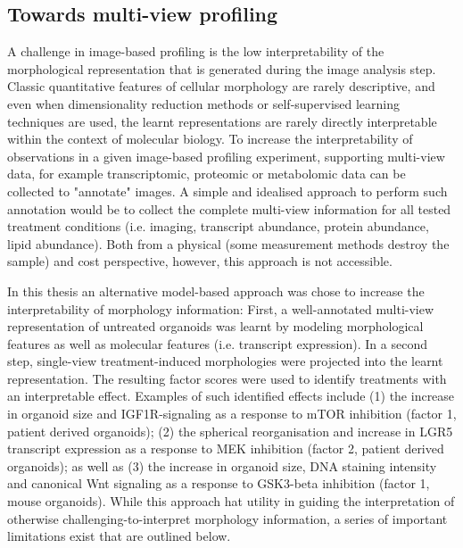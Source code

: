 \begin{flushleft}
\subsection{Towards multi-view profiling}
A challenge in image-based profiling is the low interpretability of the morphological representation that is generated during the image analysis step. Classic quantitative features of cellular morphology are rarely descriptive, and even when dimensionality reduction methods or self-supervised learning techniques are used, the learnt representations are rarely directly interpretable within the context of molecular biology. To increase the interpretability of observations in a given image-based profiling experiment, supporting multi-view data, for example transcriptomic, proteomic or metabolomic data can be collected to "annotate" images. A simple and idealised approach to perform such annotation would be to collect the complete multi-view information for all tested treatment conditions (i.e. imaging, transcript abundance, protein abundance, lipid abundance). Both from a physical (some measurement methods destroy the sample) and cost perspective, however, this approach is not accessible. 
\smallbreak

In this thesis an alternative model-based approach was chose to increase the interpretability of morphology information: First, a well-annotated multi-view representation of untreated organoids was learnt by modeling morphological features as well as molecular features (i.e. transcript expression). In a second step, single-view treatment-induced morphologies were projected into the learnt representation. The resulting factor scores were used to identify treatments with an interpretable effect. Examples of such identified effects include (1) the increase in organoid size and IGF1R-signaling as a response to mTOR inhibition (factor 1, patient derived organoids); (2) the spherical reorganisation and increase in LGR5 transcript expression as a response to MEK inhibition (factor 2, patient derived organoids); as well as (3) the increase in organoid size, DNA staining intensity and canonical Wnt signaling as a response to GSK3-beta inhibition (factor 1, mouse organoids). While this approach hat utility in guiding the interpretation of otherwise challenging-to-interpret morphology information, a series of important limitations exist that are outlined below.
\smallbreak


\end{flushleft}

